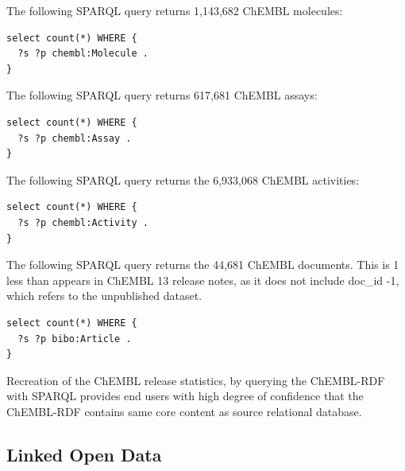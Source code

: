 \documentclass[10pt]{bmc_article}
\newenvironment{bmcformat}{\begin{raggedright}\baselineskip20pt\sloppy\setboolean{publ}{false}}{\end{raggedright}\baselineskip20pt\sloppy}
\begin{document}
\begin{bmcformat}
The following SPARQL query returns 1,143,682 ChEMBL molecules:


\begin{small}
\begin{verbatim}
select count(*) WHERE {
  ?s ?p chembl:Molecule .
}
\end{verbatim}
\end{small}

The following SPARQL query returns 617,681 ChEMBL assays:

\begin{small}
\begin{verbatim}
select count(*) WHERE {
  ?s ?p chembl:Assay .
}
\end{verbatim}
\end{small}

The following SPARQL query returns the 6,933,068 ChEMBL activities:

\begin{small}
\begin{verbatim}
select count(*) WHERE {
  ?s ?p chembl:Activity .
}
\end{verbatim}
\end{small}

The following SPARQL query returns the 44,681 ChEMBL documents. This is 1 less than appears 
in ChEMBL 13 release notes, as it does not include doc\_id -1, which refers to the 
unpublished dataset.

\begin{small}
\begin{verbatim}
select count(*) WHERE {
  ?s ?p bibo:Article .
}
\end{verbatim}
\end{small}

Recreation of the ChEMBL release statistics, by querying the ChEMBL-RDF with SPARQL 
provides end users with high degree of confidence that the ChEMBL-RDF contains same 
core content as source relational database. 


\subsection*{Linked Open Data}


\end{bmcformat}
\end{document}
